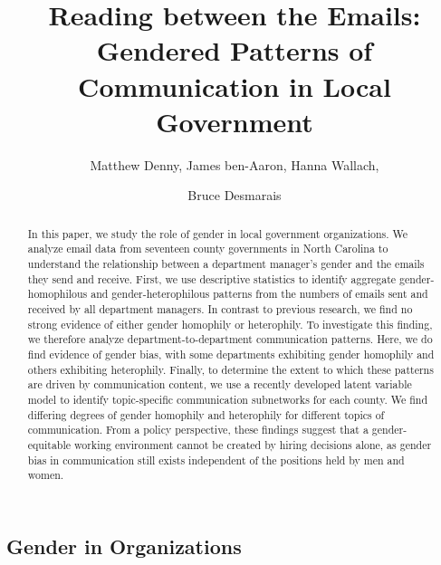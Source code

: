 \documentclass{pnastwo}
\begin{document}
\title{Reading between the Emails: Gendered Patterns of Communication in Local Government}

\author{
Matthew Denny,
James ben-Aaron,
Hanna Wallach,
\and Bruce Desmarais
}

\contributor{\vspace{-.25cm}}


\maketitle

\begin{article}
\begin{abstract}
	
{In this paper, we study the role of gender in local government
organizations. We analyze email data from seventeen county
governments in North Carolina to understand the relationship
between a department manager's gender and the emails they send
and receive. First, we use descriptive statistics to identify
aggregate gender-homophilous and gender-heterophilous patterns
from the numbers of emails sent and received by all department
managers. In contrast to previous research, we find no strong
evidence of either gender homophily or heterophily. To
investigate this finding, we therefore analyze
department-to-department communication patterns. Here, we do find
evidence of gender bias, with some departments exhibiting gender
homophily and others exhibiting heterophily. Finally, to
determine the extent to which these patterns are driven by
communication content, we use a recently developed latent
variable model to identify topic-specific communication
subnetworks for each county. We find differing degrees of gender
homophily and heterophily for different topics of
communication. From a policy perspective, these findings suggest
that a gender-equitable working environment cannot be created by
hiring decisions alone, as gender bias in communication still
exists independent of the positions held by men and women.
}
\end{abstract} 



\section{Gender in Organizations}


\end{article}
\end{document}
